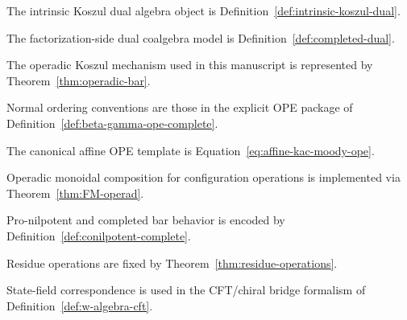 \begin{definition}\label{def:koszul-dual-alg}
The intrinsic Koszul dual algebra object is Definition~\ref{def:intrinsic-koszul-dual}.
\end{definition}

\begin{definition}\label{def:koszul-dual-coalgebra-fact}
The factorization-side dual coalgebra model is Definition~\ref{def:completed-dual}.
\end{definition}

\begin{definition}\label{def:koszul-operad-index}
The operadic Koszul mechanism used in this manuscript is represented by Theorem~\ref{thm:operadic-bar}.
\end{definition}

\begin{definition}\label{def:normal-ordering}
Normal ordering conventions are those in the explicit OPE package of Definition~\ref{def:beta-gamma-ope-complete}.
\end{definition}

\begin{definition}\label{def:ope}
The canonical affine OPE template is Equation~\eqref{eq:affine-kac-moody-ope}.
\end{definition}

\begin{definition}\label{def:operad-as-monoid}
Operadic monoidal composition for configuration operations is implemented via Theorem~\ref{thm:FM-operad}.
\end{definition}

\begin{definition}\label{def:pro-nilpotent}
Pro-nilpotent and completed bar behavior is encoded by
Definition~\ref{def:conilpotent-complete}.
\end{definition}

\begin{definition}\label{def:residue-map}
Residue operations are fixed by Theorem~\ref{thm:residue-operations}.
\end{definition}

\begin{definition}\label{def:state-field-correspondence}
State-field correspondence is used in the CFT/chiral bridge formalism of Definition~\ref{def:w-algebra-cft}.
\end{definition}

